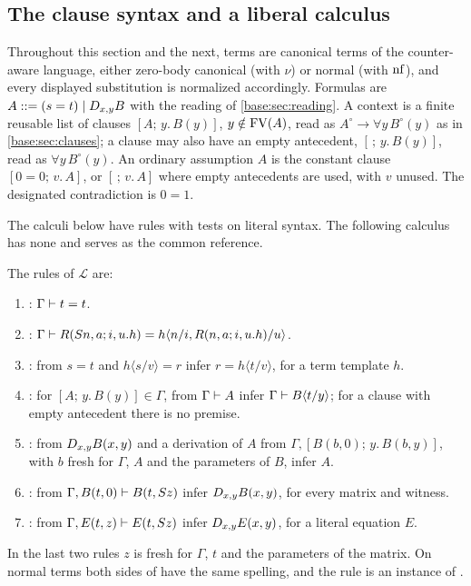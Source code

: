 \subsection{The clause syntax and a liberal calculus}

Throughout this section and the next, terms are canonical terms of the counter-aware
language, either zero-body canonical (with $\nu$) or normal (with $\operatorname{nf}$), and every
displayed substitution is normalized accordingly. Formulas are
$A ::= (s=t)\mid D_{x,y}B$ with the reading of \cref{base:sec:reading}. A context is a
finite reusable list of clauses $[A;\,y.\,B(y)]$, $y\notin\operatorname{FV}(A)$, read as
$A^\circ\to\forall y\,B^\circ(y)$ as in \cref{base:sec:clauses}; a clause may also have an
empty antecedent, $[\,;\,y.\,B(y)]$, read as $\forall y\,B^\circ(y)$. An ordinary assumption
$A$ is the constant clause $[0=0;\,v.\,A]$, or $[\,;\,v.\,A]$ where empty antecedents are
used, with $v$ unused. The designated contradiction is $0=1$.

The calculi below have rules with tests on literal syntax. The following calculus has none
and serves as the common reference.

\begin{definition}\label{ctr:def:liberal}
The rules of $\mathcal L$ are:
\begin{enumerate}
\item {}: $\Gamma\vdash t=t$.
\item {}: $\Gamma\vdash R(S n,a;i,u.h)=h\langle n/i,R(n,a;i,u.h)/u\rangle$.
\item {}: from $s=t$ and $h\langle s/v\rangle=r$ infer $r=h\langle t/v\rangle$, for a
term template $h$.
\item {}: for $[A;\,y.\,B(y)]\in\Gamma$, from $\Gamma\vdash A$ infer
$\Gamma\vdash B\langle t/y\rangle$; for a clause with empty antecedent there is no premise.
\item {}: from $D_{x,y}B(x,y)$ and a derivation of $A$ from
$\Gamma,[B(b,0);\,y.\,B(b,y)]$, with $b$ fresh for $\Gamma$, $A$ and the parameters of $B$,
infer $A$.
\item {}: from $\Gamma,B(t,0)\vdash B(t,S z)$ infer $D_{x,y}B(x,y)$, for
every matrix and witness.
\item {}: from $\Gamma,E(t,z)\vdash E(t,S z)$ infer $D_{x,y}E(x,y)$, for a
literal equation $E$.
\end{enumerate}
In the last two rules $z$ is fresh for $\Gamma$, $t$ and the parameters of the matrix. On
normal terms both sides of  have the same spelling, and the rule is an
instance of .
\end{definition}

